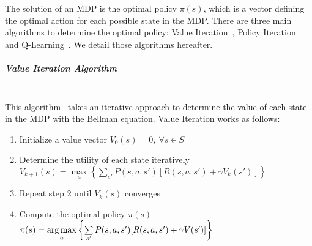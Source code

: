 The solution of an MDP is the optimal policy $\pi(s)$, which is a vector defining the optimal action for each possible state in the MDP.
There are three main algorithms to determine the optimal policy: Value Iteration~\cite{bellman1957}, Policy Iteration~\cite{policyiteration} and Q-Learning~\cite{qlearning}.
We detail those algorithms hereafter.


\subparagraph{Value Iteration Algorithm}\textbf{\\}
This algorithm~\cite{bellman1957} takes an iterative approach to determine the value of each state in the MDP with the Bellman equation.
Value Iteration works as follows:
\begin{enumerate}
    \item Initialize a value vector $V_0(s)=0,~\forall s\in S$
    \item Determine the utility of each state iteratively\\{$V_{k+1}(s) = \max\limits_a \left \{\sum\limits_{s'} P(s,a,s')[R(s,a,s') + \gamma V_k(s')] \right \}$}
    \item Repeat step 2 until $V_{k}(s)$ converges
    \item Compute the optimal policy $\pi(s)$\\$\pi(s) = \operatorname*{arg\,max}\limits_a \left \{\sum\limits_{s'}P(s,a,s')[R(s,a,s') + \gamma V(s')] \right \}$
\end{enumerate}

